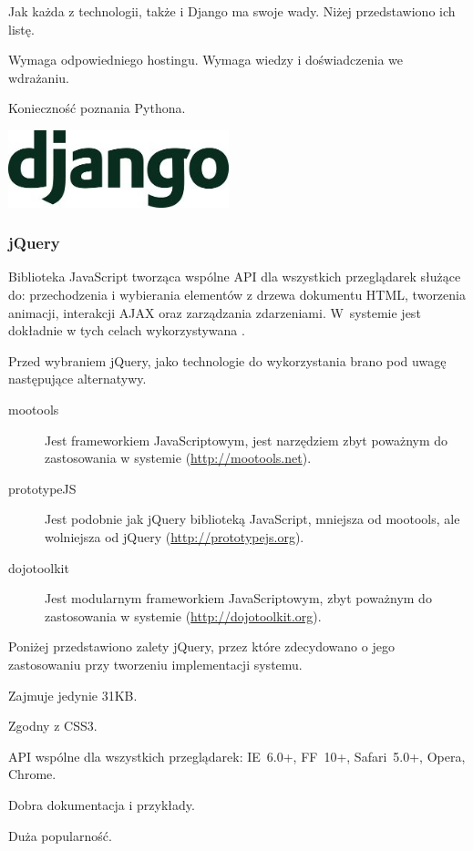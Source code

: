 Jak każda z technologii, także i Django ma swoje wady. Niżej przedstawiono ich listę.
\begin{packed_item}
    \item{Wymaga odpowiedniego hostingu. Wymaga wiedzy i doświadczenia we wdrażaniu.}
    \item{Konieczność poznania Pythona.}
\end{packed_item}

\begin{center}
    \includegraphics[width=0.48\textwidth]{img/logos/django.jpg}
\end{center}

\newpage
\subsubsection{jQuery}
Biblioteka JavaScript tworząca wspólne API dla wszystkich przeglądarek służące do: przechodzenia i wybierania elementów z drzewa dokumentu HTML, tworzenia animacji, interakcji AJAX oraz zarządzania zdarzeniami. W~systemie jest dokładnie w tych celach wykorzystywana \cite{jQuery}.

Przed wybraniem jQuery, jako technologie do wykorzystania brano pod uwagę następujące alternatywy.
\begin{description}
    \item[mootools] Jest frameworkiem JavaScriptowym, jest narzędziem zbyt poważnym do zastosowania w systemie (\url{http://mootools.net}).
    \item[prototypeJS] Jest podobnie jak jQuery biblioteką JavaScript, mniejsza od mootools, ale wolniejsza od jQuery (\url{http://prototypejs.org}).
    \item[dojotoolkit] Jest modularnym frameworkiem JavaScriptowym, zbyt poważnym do zastosowania w systemie (\url{http://dojotoolkit.org}).
\end{description}

Poniżej przedstawiono zalety jQuery, przez które zdecydowano o jego zastosowaniu przy tworzeniu implementacji systemu.
\begin{packed_item}
    \item{Zajmuje jedynie 31KB.}
    \item{Zgodny z CSS3.}
    \item{API wspólne dla wszystkich przeglądarek: IE~6.0+, FF~10+, Safari~5.0+, Opera, Chrome.}
    \item{Dobra dokumentacja i przykłady.}
    \item{Duża popularność.}
\end{packed_item}

